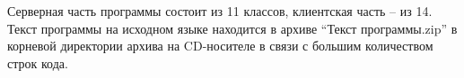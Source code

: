 Серверная часть программы состоит из 11 классов, клиентская часть -- из 14.
Текст программы на исходном языке находится в архиве “Текст
программы.zip” в корневой директории архива на CD-носителе
в связи с большим количеством строк кода.


